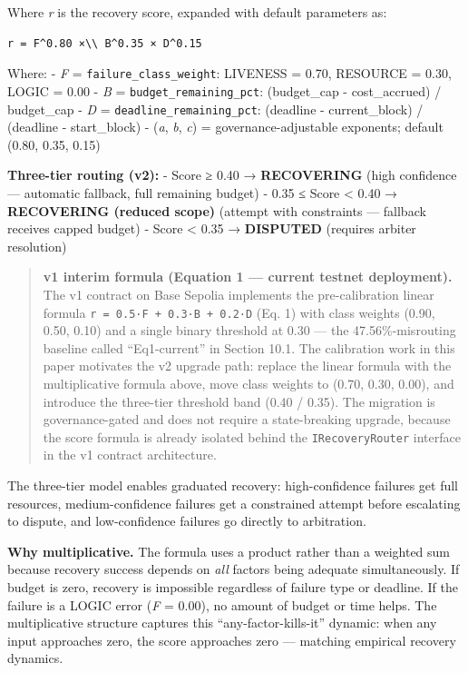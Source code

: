 \documentclass[
  10pt,
]{article}
\begin{document}
Where \emph{r} is the recovery score, expanded with default parameters
as:

\begin{verbatim}
r = F^0.80 ×\\ B^0.35 × D^0.15
\end{verbatim}

Where: - \emph{F} = \texttt{failure\_class\_weight}: LIVENESS = 0.70,
RESOURCE = 0.30, LOGIC = 0.00 - \emph{B} =
\texttt{budget\_remaining\_pct}: (budget\_cap - cost\_accrued) /
budget\_cap - \emph{D} = \texttt{deadline\_remaining\_pct}: (deadline -
current\_block) / (deadline - start\_block) - (\emph{a}, \emph{b},
\emph{c}) = governance-adjustable exponents; default (0.80, 0.35, 0.15)

\textbf{Three-tier routing (v2):} - Score ≥ 0.40 → \textbf{RECOVERING}
(high confidence --- automatic fallback, full remaining budget) - 0.35 ≤
Score \textless{} 0.40 → \textbf{RECOVERING (reduced scope)} (attempt
with constraints --- fallback receives capped budget) - Score
\textless{} 0.35 → \textbf{DISPUTED} (requires arbiter resolution)

\begin{quote}
\textbf{v1 interim formula (Equation 1 --- current testnet deployment).}
The v1 contract on Base Sepolia implements the pre-calibration linear
formula \texttt{r\ =\ 0.5·F\ +\ 0.3·B\ +\ 0.2·D} (Eq. 1) with class
weights (0.90, 0.50, 0.10) and a single binary threshold at 0.30 --- the
47.56\%-misrouting baseline called ``Eq1-current'' in Section 10.1. The
calibration work in this paper motivates the v2 upgrade path: replace
the linear formula with the multiplicative formula above, move class
weights to (0.70, 0.30, 0.00), and introduce the three-tier threshold
band (0.40 / 0.35). The migration is governance-gated and does not
require a state-breaking upgrade, because the score formula is already
isolated behind the \texttt{IRecoveryRouter} interface in the v1
contract architecture.
\end{quote}

The three-tier model enables graduated recovery: high-confidence
failures get full resources, medium-confidence failures get a
constrained attempt before escalating to dispute, and low-confidence
failures go directly to arbitration.

\textbf{Why multiplicative.} The formula uses a product rather than a
weighted sum because recovery success depends on \emph{all} factors
being adequate simultaneously. If budget is zero, recovery is impossible
regardless of failure type or deadline. If the failure is a LOGIC error
(\emph{F} = 0.00), no amount of budget or time helps. The multiplicative
structure captures this ``any-factor-kills-it'' dynamic: when any input
approaches zero, the score approaches zero --- matching empirical
recovery dynamics.
\end{document}
